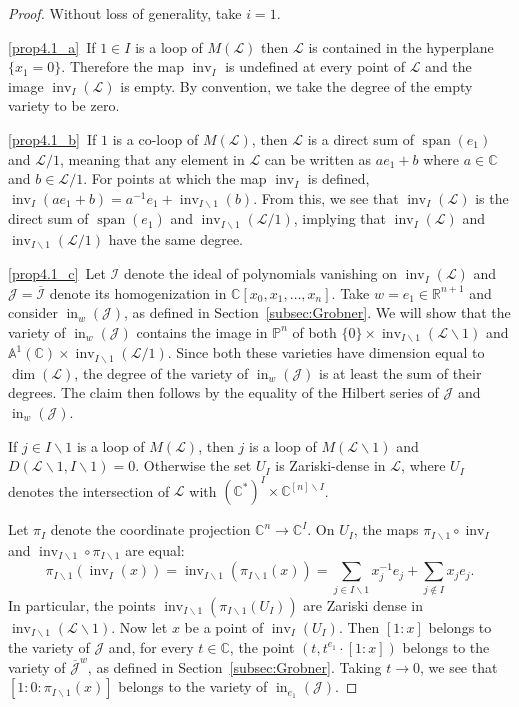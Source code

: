 \documentclass[10pt]{amsart}
\theoremstyle{definition}
\newcommand{\PP}{\mathbb{P}}
\newcommand{\R}{\mathbb{R}}
\newcommand{\Cbb}{\mathbb{C}}
\newcommand{\I}{\mathcal{I}}
\newcommand{\J}{\mathcal{J}}
\newcommand{\cL}{\mathcal{L}}
\newcommand{\ol}{\overline}
\DeclareMathOperator{\In}{in}
\DeclareMathOperator{\inv}{inv}
\DeclareMathOperator{\spanrm}{span}
\begin{document}
\begin{proof} Without loss of generality, take $i = 1$. 

\ref{prop4.1_a}~If $1\in I$ is a loop of $M(\cL)$ then $\cL$ is contained in the hyperplane $\{x_1=0\}$. 
Therefore the map $\inv_I$ is undefined at every point of $\cL$ and the image $\inv_I(\cL)$ is empty. 
By convention, we take the degree of the empty variety to be zero. 

\ref{prop4.1_b}~If $1$ is a co-loop of $M(\cL)$, then $\cL$ is a direct sum of $\spanrm (e_1)$ and $\cL/1$, meaning that 
any element in $\cL$ can be written as $ae_1 + b$ where $a\in \Cbb$ and $b\in \cL/1$. 
For points at which the map $\inv_I$ is defined, $\inv_I(ae_1 + b) = a^{-1}e_1 + \inv_{I\backslash 1}(b)$. 
From this, we see that $\inv_I(\cL)$ is the direct sum of $\spanrm (e_1)$ and $\inv_{I\backslash 1}(\cL/1)$, 
implying that $\inv_{I}(\cL)$ and $\inv_{I\backslash 1}(\cL/1)$ have the same degree. 

\ref{prop4.1_c}~Let $\I$ denote the ideal of polynomials vanishing on $\inv_I(\cL)$ and 
$\J = \ol{\I}$ denote its homogenization in $\Cbb[x_0,x_1,\ldots , x_n]$. 
Take $w = e_1 \in \R^{n+1}$ and consider $\In_w(\J)$, 
as defined in Section~\ref{subsec:Grobner}. 
We will show that the variety of $\In_w(\J)$ contains 
the image in $\PP^n$ of both $\{0\}\times \inv_{I\backslash 1}(\cL\backslash 1)$ and 
$\mathbb{A}^1(\Cbb)\times \inv_{I\backslash 1}(\cL/ 1)$. 
Since both these varieties have dimension equal to $\dim(\cL)$, the degree of the variety of $\In_w(\J)$ is at least the sum of their degrees. 
The claim then follows by the equality of the Hilbert series of $\J$ and $\In_w(\J)$. 


If $j\in I\backslash 1$ is a loop of $M(\cL)$, then $j$ is a loop of $M(\cL\backslash 1)$ and $D(\cL\backslash 1,I\backslash 1)=0$.
Otherwise the set $U_I$ is Zariski-dense in $\cL$, where $U_I$ denotes the intersection of 
$\cL$ with $(\Cbb^*)^I\times \Cbb^{[n]\backslash I}$. 

Let $\pi_I$ denote the coordinate projection $\Cbb^n \rightarrow \Cbb^I$. On $U_I$, the maps 
$\pi_{I\backslash 1}\circ \inv_I$ and $\inv_{I\backslash 1} \circ \pi_{I\backslash 1}$ are equal:
\[\pi_{I\backslash 1}(\inv_I(x))   =   \inv_{I\backslash 1}(\pi_{I\backslash 1}(x))  = 
\sum_{j\in I\backslash 1} x_j^{-1} e_j + \sum_{j\not\in I} x_j e_j. 
\]
In particular, the points $\inv_{I\backslash 1}(\pi_{I\backslash 1}(U_I))$ are Zariski dense in $\inv_{I\backslash 1}(\cL\backslash 1)$. 
Now let $x$ be a point of $ \inv_I(U_I)$. 
Then $[1: x]$ belongs to the variety of $\J$ and, for every $t\in \Cbb$, the point $(t,t^{e_1}\cdot[1:x])$ belongs to the 
variety of $\ol{\J}^{w}$, as defined in Section~\ref{subsec:Grobner}. Taking $t\rightarrow 0$, we see that $[1:0:\pi_{I\backslash 1}(x)]$ belongs to the variety of $\In_{e_1}(\J)$. 



\end{proof}
\end{document}
